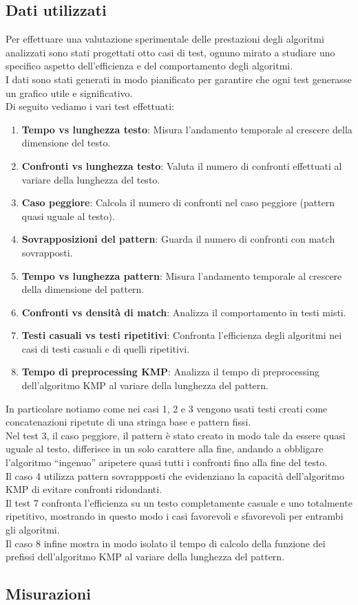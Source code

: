 \documentclass{article}
\begin{document}
\subsection{Dati utilizzati}
Per effettuare una valutazione sperimentale delle prestazioni degli algoritmi analizzati sono stati progettati otto casi di test, ognuno mirato a studiare uno specifico aspetto dell'efficienza e del comportamento degli algoritmi.\\
I dati sono stati generati in modo pianificato per garantire che ogni test generasse un grafico utile e significativo.\\
Di seguito vediamo i vari test effettuati:
\begin{enumerate}
    \item \textbf{Tempo vs lunghezza testo}: Misura l'andamento temporale al crescere della dimensione del testo.
    \item \textbf{Confronti vs lunghezza testo}: Valuta il numero di confronti effettuati al variare della lunghezza del testo.
    \item \textbf{Caso peggiore}: Calcola il numero di confronti nel caso peggiore (pattern quasi uguale al testo).
    \item \textbf{Sovrapposizioni del pattern}: Guarda il numero di confronti con match sovrapposti.
    \item \textbf{Tempo vs lunghezza pattern}: Misura l'andamento temporale al crescere della dimensione del pattern.
    \item \textbf{Confronti vs densità di match}: Analizza il comportamento in testi misti.
    \item \textbf{Testi casuali vs testi ripetitivi}: Confronta l'efficienza degli algoritmi nei casi di testi casuali e di quelli ripetitivi.
    \item \textbf{Tempo di preprocessing KMP}: Analizza il tempo di preprocessing dell'algoritmo KMP al variare della lunghezza del pattern.
\end{enumerate}
In particolare notiamo come nei casi 1, 2 e 3 vengono usati testi creati come concatenazioni ripetute di una stringa base e pattern fissi.\\
Nel test 3, il caso peggiore, il pattern è stato creato in modo tale da essere quasi uguale al testo, differisce in un solo carattere alla fine, andando a obbligare l'algoritmo ``ingenuo'' aripetere quasi tutti i confronti fino alla fine del testo.\\
Il caso 4 utilizza pattern sovrappposti che evidenziano la capacità dell'algoritmo KMP di evitare confronti ridondanti.\\
Il test 7 confronta l'efficienza su un testo completamente casuale e uno totalmente ripetitivo, mostrando in questo modo i casi favorevoli e sfavorevoli per entrambi gli algoritmi.\\
Il caso 8 infine mostra in modo isolato il tempo di calcolo della funzione dei prefissi dell'algoritmo KMP al variare della lunghezza del pattern.\\

\subsection{Misurazioni}
\end{document}
